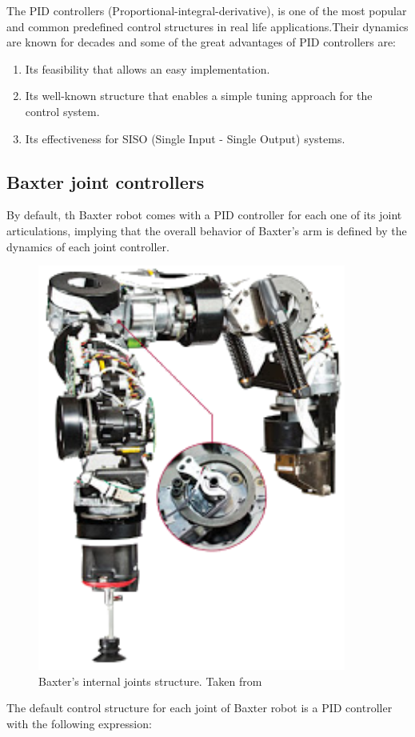 \documentclass[11pt]{report} %
\begin{document}
The PID controllers (Proportional-integral-derivative), is one of the most popular and common predefined control structures in real life applications.Their dynamics are known for decades and some of the great advantages of PID controllers are:

\begin{enumerate}
    \item Its feasibility that allows an easy implementation.
    \item Its well-known structure that enables a simple tuning approach for the control system.
    \item Its effectiveness for SISO (Single Input - Single Output) systems. 
\end{enumerate}

\subsection{Baxter joint controllers}

By default, th Baxter robot comes with a PID controller for each one of its joint articulations, implying that the overall behavior of Baxter's arm is defined by the dynamics of each joint controller.\\

\begin{figure}[H]
    \centering
    \includegraphics[width=0.5\linewidth]{assets/imgs/control_theory/baxter_joint.png}
    \caption{Baxter's internal joints structure. Taken from \citep{cite_baxter_arms_wiki}} 
    \label{fig_baxter_internal_joint_structure}
\end{figure}

The default control structure for each joint of Baxter robot is a PID controller with the following expression:
\end{document}

